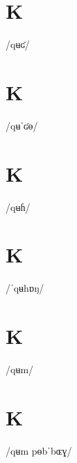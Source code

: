\documentclass[10pt,a4paper,twoside]{book}
\begin{document}
\section*{K}

\begin{multicols}{3}
 {/qʉʛ/} {}
\end{multicols}

\section*{K}

\begin{multicols}{3}
 {/qʉˈʛɵ/} {}
\end{multicols}

\section*{K}

\begin{multicols}{3}
 {/qʉɦ/} {}
\end{multicols}

\section*{K}

\begin{multicols}{3}
 {/ˈqʉhɒŋ/} {}
\end{multicols}

\section*{K}

\begin{multicols}{3}
 {/qʉm/} {}
\end{multicols}

\section*{K}

\begin{multicols}{3}
 {/qʉm pɵbˈbɶɣ/} {}
\end{multicols}
\end{document}
